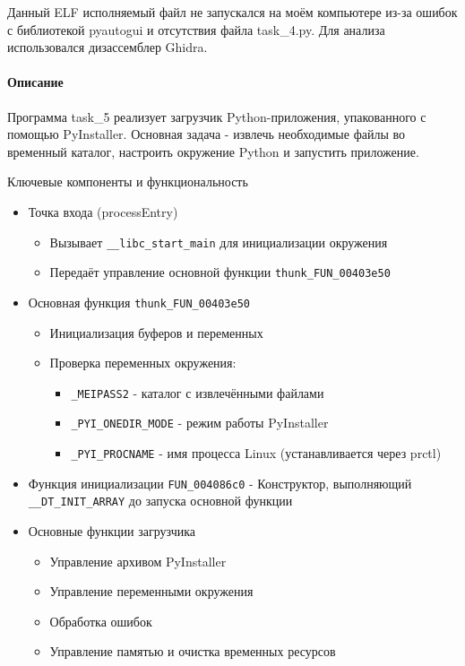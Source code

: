     Данный ELF исполняемый файл не запускался на моём компьютере из-за ошибок с библиотекой pyautogui и
    отсутствия файла task\_4.py. Для анализа использовался дизассемблер Ghidra.
    
    \paragraph{Описание}
    Программа task\_5 реализует загрузчик Python-приложения, упакованного с помощью PyInstaller.
    Основная задача - извлечь необходимые файлы во временный каталог, настроить окружение Python и запустить приложение.

    Ключевые компоненты и функциональность
    \begin{itemize}
        \item Точка входа (processEntry)
                \begin{itemize}
                    \item Вызывает \texttt{\_\_libc\_start\_main} для инициализации окружения
                    \item Передаёт управление основной функции \texttt{thunk\_FUN\_00403e50}
                \end{itemize}
        \item Основная функция \texttt{thunk\_FUN\_00403e50}
                \begin{itemize}
                    \item Инициализация буферов и переменных
                    \item Проверка переменных окружения:
                        \begin{itemize}
                            \item \texttt{\_MEIPASS2} - каталог с извлечёнными файлами
                            \item \texttt{\_PYI\_ONEDIR\_MODE} - режим работы PyInstaller
                            \item \texttt{\_PYI\_PROCNAME} - имя процесса Linux (устанавливается через prctl)
                        \end{itemize}
                \end{itemize}
        \item Функция инициализации \texttt{FUN\_004086c0} - Конструктор, выполняющий \texttt{\_\_DT\_INIT\_ARRAY}
        до запуска основной функции
        \item Основные функции загрузчика
                \begin{itemize}
                    \item Управление архивом PyInstaller
                    \item Управление переменными окружения
                    \item Обработка ошибок
                    \item Управление памятью и очистка временных ресурсов
                \end{itemize}


    \end{itemize}

